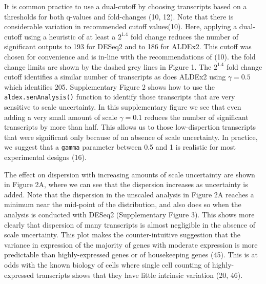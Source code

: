 \documentclass[
]{article}
\begin{document}
It is common practice to use a dual-cutoff by choosing transcripts based
on a thresholds for both q-values and fold-changes (10, 12). Note that
there is considerable variation in recommended cutoff values(10). Here,
applying a dual-cutoff using a heuristic of at least a \(2^{1.4}\) fold
change reduces the number of significant outputs to 193 for DESeq2 and
to 186 for ALDEx2. This cutoff was chosen for convenience and is in-line
with the recommendations of (10). the fold change limits are shown by
the dashed grey lines in Figure 1. The \(2^{1.4}\) fold change cutoff
identifies a similar number of transcripts as does ALDEx2 using
\(\gamma = 0.5\) which identifies 205. Supplementary Figure 2 shows how
to use the \texttt{aldex.senAnalysis()} function to identify those
transcripts that are very sensitive to scale uncertainty. In this
supplementary figure we see that even adding a very small amount of
scale \(\gamma = 0.1\) reduces the number of significant transcripts by
more than half. This allows us to those low-dispertion transcripts that
were significant only because of an absence of scale uncertainty. In
practice, we suggest that a \texttt{gamma} parameter between 0.5 and 1
is realistic for most experimental designs (16).

The effect on dispersion with increasing amounts of scale uncertainty
are shown in Figure 2A, where we can see that the dispersion increases
as uncertainty is added. Note that the dispersion in the unscaled
analysis in Figure 2A reaches a minimum near the mid-point of the
distribution, and also does so when the analysis is conducted with
DESeq2 (Supplementary Figure 3). This shows more clearly that dispersion
of many transcripts is almost negligible in the absence of scale
uncertainty. This plot makes the counter-intuitive suggestion that the
variance in expression of the majority of genes with moderate expression
is more predictable than highly-expressed genes or of housekeeping genes
(45). This is at odds with the known biology of cells where single cell
counting of highly-expressed transcripts shows that they have little
intrinsic variation (20, 46).
\end{document}
